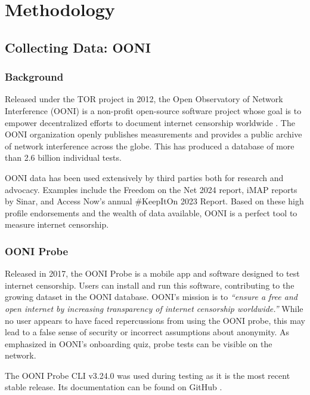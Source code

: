 \chapter{Methodology}

\section{Collecting Data: OONI}

\subsection{Background}
Released under the TOR project in 2012, the Open Observatory of Network Interference (OONI) is a non-profit open-source software project whose goal is to empower decentralized efforts to document internet censorship worldwide \cite{OONIAbout}. The OONI organization openly publishes measurements and provides a public archive of network interference across the globe. This has produced a database of more than 2.6 billion individual tests. \cite{OONIExplorer}

OONI data has been used extensively by third parties both for research and advocacy. Examples include the Freedom on the Net 2024 \cite{freedomhouse2024struggle} report, iMAP reports \cite{ooni2024imap} by Sinar, and Access Now’s annual \#KeepItOn 2023 Report. \cite{accessnow2023keepiton} \cite{ooni2024yearinreview} Based on these high profile endorsements and the wealth of data available, OONI is a perfect tool to measure internet censorship.

\subsection{OONI Probe}
Released in 2017, the OONI Probe is a mobile app and software designed to test internet censorship. Users can install and run this software, contributing to the growing dataset in the OONI database. OONI's mission is to \textit{“ensure a free and open internet by increasing transparency of internet censorship worldwide.”} While no user appears to have faced repercussions from using the OONI probe, this may lead to a false sense of security or incorrect assumptions about anonymity. As emphasized in OONI’s onboarding quiz, probe tests can be visible on the network.

The OONI Probe CLI v3.24.0 was used during testing as it is the most recent stable release. Its documentation can be found on GitHub \cite{oonicli2024}.

